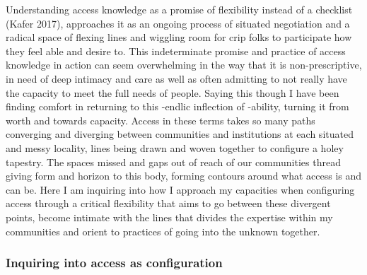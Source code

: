 Understanding access knowledge as a promise of flexibility instead of a
checklist (Kafer 2017), approaches it as an ongoing process of situated
negotiation and a radical space of flexing lines and wiggling room for
crip folks to participate how they feel able and desire to. This
indeterminate promise and practice of access knowledge in action can
seem overwhelming in the way that it is non-prescriptive, in need of
deep intimacy and care as well as often admitting to not really have the
capacity to meet the full needs of people. Saying this though I have
been finding comfort in returning to this -endlic inflection of
-ability, turning it from worth and towards capacity. Access in these
terms takes so many paths converging and diverging between communities
and institutions at each situated and messy locality, lines being drawn
and woven together to configure a holey tapestry. The spaces missed and
gaps out of reach of our communities thread giving form and horizon to
this body, forming contours around what access is and can be. Here I am
inquiring into how I approach my capacities when configuring access
through a critical flexibility that aims to go between these divergent
points, become intimate with the lines that divides the expertise within
my communities and orient to practices of going into the unknown
together.

\hypertarget{inquiring-into-access-as-configuration}{%
\subsubsection[Inquiring into access as
configuration]{\texorpdfstring{\protect\hypertarget{anchor}{}{}Inquiring
into access as
configuration}{Inquiring into access as configuration}}\label{inquiring-into-access-as-configuration}}

